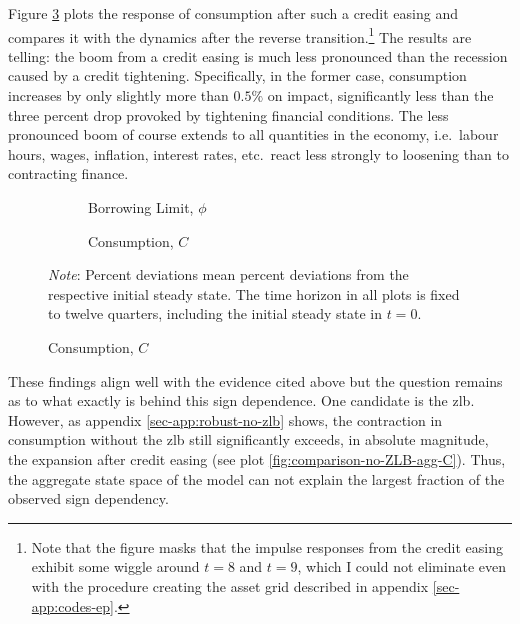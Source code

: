 \documentclass[a4paper,12pt]{article} %
\numberwithin{equation}{section} %
\numberwithin{figure}{section}
\numberwithin{table}{section}
\begin{document}
Figure \ref{fig:comparison-asymmetry-C} plots the response of consumption after such a credit easing and compares it with the dynamics after the reverse transition.\footnote{Note that the figure masks that the impulse responses from the credit easing exhibit some wiggle around $t=8$ and $t=9$, which I could not eliminate even with the procedure creating the asset grid described in appendix \ref{sec-app:codes-ep}.} The results are telling: the boom from a credit easing is much less pronounced than the recession caused by a credit tightening. Specifically, in the former case, consumption increases by only slightly more than $0.5\%$ on impact, significantly less than the three percent drop provoked by tightening financial conditions. The less pronounced boom of course extends to all quantities in the economy, i.e.~labour hours, wages, inflation, interest rates, etc.~react less strongly to loosening than to contracting finance.

\begin{figure}[t]
    \caption{Baseline Model -- Shock to Borrowing Limit: Asymmetry}
    \label{fig:comparison-asymmetry}
    \centering
    \begin{subfigure}[b]{0.49\textwidth}
    \caption{Borrowing Limit, $\phi$}
    \label{fig:comparison-asymmetry-phi}
         \centering
         
     \end{subfigure}
    \hfill
    \begin{subfigure}[b]{0.49\textwidth}
    \caption{Consumption, $C$}
    \label{fig:comparison-asymmetry-C}
         \centering
         
     \end{subfigure}
     
     \vspace{10pt}
     
     \justifying
     \footnotesize
	\textit{Note}: Percent deviations mean percent deviations from the respective initial steady state. The time horizon in all plots is fixed to twelve quarters, including the initial steady state in $t=0$.
\end{figure}

These findings align well with the evidence cited above but the question remains as to what exactly is behind this sign dependence. One candidate is the \Gls{zlb}. However, as appendix \ref{sec-app:robust-no-zlb} shows, the contraction in consumption without the \Gls{zlb} still significantly exceeds, in absolute magnitude, the expansion after credit easing (see plot \ref{fig:comparison-no-ZLB-agg-C}). Thus, the aggregate state space of the model can not explain the largest fraction of the observed sign dependency.
\end{document}
